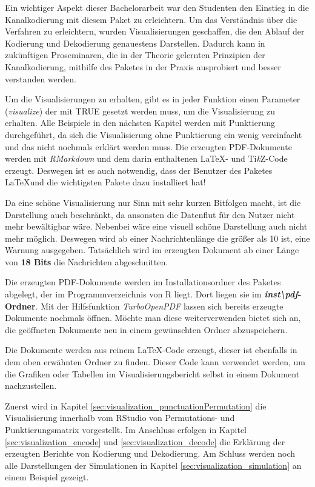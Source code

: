 Ein wichtiger Aspekt dieser Bachelorarbeit war den Studenten den Einstieg in die Kanalkodierung mit diesem Paket zu erleichtern. Um das Verständnis über die Verfahren zu erleichtern, wurden Visualisierungen geschaffen, die den Ablauf der Kodierung und Dekodierung genauestens Darstellen. Dadurch kann in zukünftigen Proseminaren, die in der Theorie gelernten Prinzipien der Kanalkodierung, mithilfe des Paketes in der Praxis ausprobiert und besser verstanden werden.

Um die Visualisierungen zu erhalten, gibt es in jeder Funktion einen Parameter (\emph{visualize}) der mit TRUE gesetzt werden muss, um die Visualisierung zu erhalten. Alle Beispiele in den nächsten Kapitel werden mit Punktierung durchgeführt, da sich die Visualisierung ohne Punktierung ein wenig vereinfacht und das nicht nochmals erklärt werden muss. Die erzeugten PDF-Dokumente werden mit \emph{RMarkdown} und dem darin enthaltenen \LaTeX - und Ti\textit{k}Z-Code erzeugt. Deswegen ist es auch notwendig, dass der Benutzer des Paketes \LaTeX und die wichtigsten Pakete dazu installiert hat!

Da eine schöne Visualisierung nur Sinn mit sehr kurzen Bitfolgen macht, ist die Darstellung auch beschränkt, da ansonsten die Datenflut für den Nutzer nicht mehr bewältigbar wäre. Nebenbei wäre eine visuell schöne Darstellung auch nicht mehr möglich. Deswegen wird ab einer Nachrichtenlänge die größer als 10 ist, eine Warnung ausgegeben. Tatsächlich wird im erzeugten Dokument ab einer Länge von \textbf{18 Bits} die Nachrichten abgeschnitten.

Die erzeugten PDF-Dokumente werden im Installationsordner des Paketes abgelegt, der im Programmverzeichnis von R liegt. Dort liegen sie im \textbf{\emph{inst\textbackslash pdf}-Ordner}. Mit der Hilfsfunktion \emph{TurboOpenPDF} lassen sich bereits erzeugte Dokumente nochmals öffnen. Möchte man diese weiterverwenden bietet sich an, die geöffneten Dokumente neu in einem gewünschten Ordner abzuspeichern.

Die Dokumente werden aus reinem \LaTeX -Code erzeugt, dieser ist ebenfalls in dem oben erwähnten Ordner zu finden. Dieser Code kann verwendet werden, um die Grafiken oder Tabellen im Visualisierungsbericht selbst in einem Dokument nachzustellen.

Zuerst wird in Kapitel \ref{sec:visualization_punctuationPermutation} die Visualisierung innerhalb vom RStudio von Permutations- und Punktierungsmatrix vorgestellt. Im Anschluss erfolgen in Kapitel \ref{sec:visualization_encode} und \ref{sec:visualization_decode} die Erklärung der erzeugten Berichte von Kodierung und Dekodierung. Am Schluss werden noch alle Darstellungen der Simulationen in Kapitel \ref{sec:visualization_simulation} an einem Beispiel gezeigt. 
